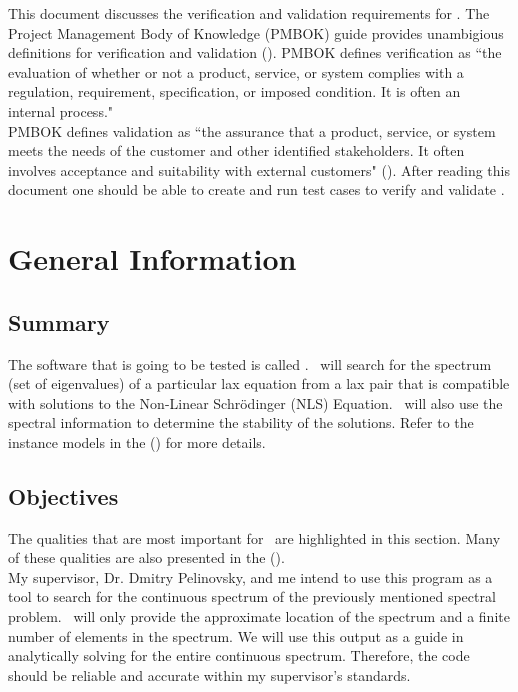 \documentclass[12pt, titlepage]{article}
\begin{document}
\newpage

\tableofcontents

\listoftables


\newpage


This document discusses the verification and validation requirements for 
\progname. The Project Management Body of Knowledge (PMBOK) guide 
provides 
unambigious definitions for verification and validation (\cite{PMBOK}). PMBOK 
defines 
verification as ``the evaluation of whether or not a product, service, or 
system 
complies with a regulation, requirement, specification, or imposed condition. 
It is often an internal process." \\

PMBOK defines validation as ``the assurance that 
a product, service, or system meets the needs of the customer and other 
identified stakeholders. It often involves acceptance and suitability with 
external customers" (\cite{PMBOK}). After reading this 
document one should be able to create and run test cases to verify and validate 
\progname. 

\section{General Information}

\subsection{Summary}
\label{Summary} 

The software that is going to be tested is called \progname. \progname \ will 
search for the 
spectrum (set of eigenvalues) of a particular lax equation from a lax pair that 
is compatible 
with solutions to the Non-Linear Schr\"{o}dinger (NLS) Equation. \progname \
will also use the spectral information to determine the stability of the 
solutions. Refer to the 
instance models in the (\cite{SRS}) for more details.
\subsection{Objectives}
\label{Objectives}
	The qualities that are most important for \progname \ are highlighted in 
	this section. Many of these qualities are also presented in the 
	(\cite{SRS}). \\
	
	My supervisor, Dr$.$ Dmitry Pelinovsky, and me intend to use this program 
	as 
	a tool to search for the 
	continuous spectrum of the previously mentioned spectral problem. 
	\progname \
	will only provide the approximate 
	location of the spectrum and a finite number of elements in the spectrum. 	
	We will 
	use this output as a guide in analytically solving for the 
	entire continuous spectrum.  Therefore, the 
	code should be reliable and accurate within my supervisor's standards. \\
	
\end{document}
